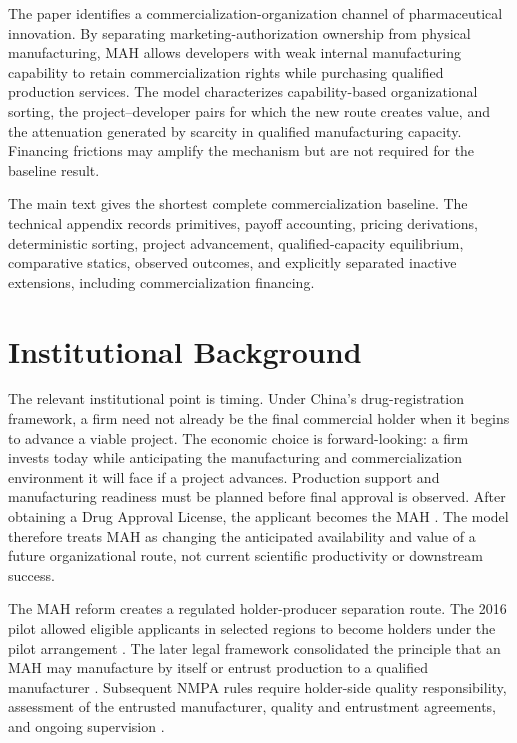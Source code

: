 \documentclass[12pt]{article}
\newcommand{\1}{\mathbf{1}}
\begin{document}
The paper identifies a commercialization-organization channel of
pharmaceutical innovation. By separating marketing-authorization ownership
from physical manufacturing, MAH allows developers with weak internal
manufacturing capability to retain commercialization rights while purchasing
qualified production services. The model characterizes capability-based
organizational sorting, the project--developer pairs for which the new route
creates value, and the attenuation generated by scarcity in qualified
manufacturing capacity. Financing frictions may amplify the mechanism but are
not required for the baseline result.

The main text gives the shortest complete commercialization baseline. The
technical appendix records primitives, payoff accounting, pricing
derivations, deterministic sorting, project advancement, qualified-capacity
equilibrium, comparative statics, observed outcomes, and explicitly separated
inactive extensions, including commercialization financing.

\section{Institutional Background}

The relevant institutional point is timing. Under China's drug-registration
framework, a firm need not already be the final commercial holder when it
begins to advance a viable project. The economic choice is forward-looking: a
firm invests today while anticipating the manufacturing and commercialization
environment it will face if a project advances. Production support and
manufacturing readiness must be planned before final approval is observed.
After obtaining a Drug Approval License, the applicant becomes the MAH
\citep{NMPARegistration2022}. The model therefore treats MAH as changing the
anticipated availability and value of a future organizational route, not
current scientific productivity or downstream success.

The MAH reform creates a regulated holder-producer separation route. The 2016
pilot allowed eligible applicants in selected regions to become holders under
the pilot arrangement
\citep{StateCouncilMAHPilot2016,CFDAMAHImplementation2016}. The later legal
framework consolidated the principle that an MAH may manufacture by itself or
entrust production to a qualified manufacturer
\citep{DrugAdministrationLaw2019}. Subsequent NMPA rules require holder-side
quality responsibility, assessment of the entrusted manufacturer, quality and
entrustment agreements, and ongoing supervision
\citep{NMPAHolderResponsibility2022,NMPAManufacturing2022,NMPAEntrustedProduction2023}.
\end{document}
